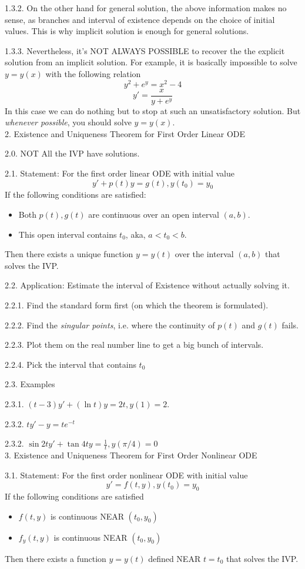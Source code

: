 \documentclass[11pt]{article}
\begin{document}
1.3.2. On the other hand for general solution, the above information makes no sense, as branches and interval of existence depends on the choice of initial values. This is why implicit solution is enough for general solutions.

1.3.3. Nevertheless, it's NOT ALWAYS POSSIBLE to recover the the explicit solution from an implicit solution. For example, it is basically impossible to solve $y=y(x)$ with the following relation
$$y^2 + e^y = x^2 - 4$$
$$y' = \frac{x}{y + e^y}$$
In this case we can do nothing but to stop at such an unsatisfactory solution. But \textit{whenever possible}, you should solve $y=y(x)$. \\

2. Existence and Uniqueness Theorem for First Order Linear ODE

2.0. NOT All the IVP have solutions.

2.1. Statement: For the first order linear ODE with initial value
$$y' + p(t)y = g(t), y(t_0) = y_0$$
If the following conditions are satisfied:
\begin{itemize}
\item Both $p(t), g(t)$ are continuous over an open interval $(a,b)$.
\item This open interval contains $t_0$, aka, $a<t_0<b$.
\end{itemize}
Then there exists a unique function $y=y(t)$ over the interval $(a,b)$ that solves the IVP. 


2.2. Application: Estimate the interval of Existence without actually solving it.

2.2.1. Find the standard form first (on which the theorem is formulated). 

2.2.2. Find the \textit{singular points}, i.e. where the continuity of $p(t)$ and $g(t)$ fails.

2.2.3. Plot them on the real number line to get a big bunch of intervals. 

2.2.4. Pick the interval that contains $t_0$

2.3. Examples

2.3.1. $(t-3)y' + (\ln t) y = 2t, y(1) = 2$.

2.3.2. $ty' - y = t e^{-t}$

2.3.2. $\sin 2t y' + \tan 4t y = \frac 1 t, y(\pi/4)=0$\\


3. Existence and Uniqueness Theorem for First Order Nonlinear ODE

3.1. Statement: For the first order nonlinear ODE with initial value
$$y' = f(t,y), y(t_0)= y_0$$
If the following conditions are satisfied
\begin{itemize}
\item $f(t,y)$ is continuous NEAR $(t_0, y_0)$
\item $f_y(t,y)$ is continuous NEAR $(t_0, y_0)$
\end{itemize}
Then there exists a function $y=y(t)$ defined NEAR $t=t_0$ that solves the IVP.
\end{document}
